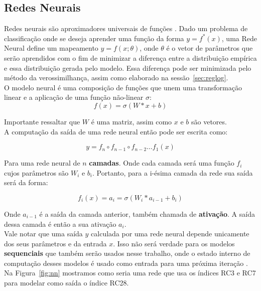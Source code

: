 \subsection{Redes Neurais}

\label{sec:nn}
Redes neurais são aproximadores universais de funções \citep{nnuni}. Dado um problema
de classificação onde se deseja aprender uma função da forma $y = f^*(x)$, uma
Rede Neural define um mapeamento $y = f(x ; \theta)$, onde $\theta$ é o vetor de
parâmetros que serão aprendidos com o fim de minimizar a diferença entre a
distribuição empírica e essa distribuição gerada pelo modelo. Essa diferença pode
ser minimizada pelo método da verossimilhança, assim como elaborado na sessão~\ref{sec:reglog}.\\

O modelo neural é uma composição de funções que unem uma transformação linear e
a aplicação de uma função não-linear $\sigma$: \\

\[ f(x)=  \sigma(W*x + b) \]

Importante ressaltar que $W$ é uma matriz, assim como $x$ e $b$ são vetores. \\

A computação da saída de uma rede neural então pode ser escrita como:

\[   y = f_n \circ f_{n-1} \circ f_{n-2} \dots f_1(x)  \]

Para uma rede neural de $n$ \textbf{camadas}. Onde cada camada será uma função
$f_i$ cujos parâmetros são $W_i$ e $b_i$. Portanto, para a i-ésima camada da rede
sua saída será da forma: 

\[ f_i (x)=  a_i = \sigma(W_i*a_{i-1} + b_i) \]

Onde $a_{i-1}$ é a saída da camada anterior, também chamada de
\textbf{ativação}. A saída dessa camada é então a sua ativação $a_i$. \\ 

Vale notar que uma saída $y$ calculada por uma rede neural depende unicamente dos
seus parâmetros e da entrada $x$. Isso não será verdade para os modelos
\textbf{sequenciais} que também serão usados nesse trabalho, onde o estado
interno de computação desses modelos é usado como entrada para uma próxima
iteração \citep{dlbook}. \\

Na Figura~\ref{fig:nn} mostramos como seria uma rede que usa os índices RC3 e RC7 para
modelar como saída o índice RC28. \\  

